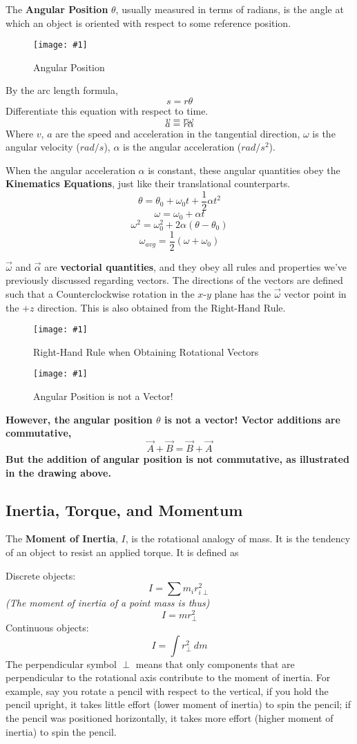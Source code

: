 \documentclass[11pt]{article}
\newcommand{\fig}[4]{
    \begin{figure}[H]
        \centering
        \texttt{[image: \#1]}
        \caption{#2}
        \label{exp4fit}
    \end{figure}
}
\theoremstyle{gangnamstyle}{\newtheorem{definition}{Definition}[]}
\theoremstyle{gangnamstyle}{\newtheorem{example}{Example}[]}
\theoremstyle{gangnamstyle}{\newtheorem{problem}{Problem}[]}
\begin{document}
The \textbf{Angular Position} $\theta$, usually measured in terms of radians, is the angle at which an object is oriented with respect to some reference position. 
\fig{figs/0718/radian.png}{Angular Position}{0.65}{0}
By the arc length formula, 
\[ s = r\theta \]
Differentiate this equation with respect to time. 
\[ v = r\omega \]
\[ a = r\alpha \]
Where $v$, $a$ are the speed and acceleration in the tangential direction, $\omega$ is the angular velocity ($rad/s$), $\alpha$ is the angular acceleration ($rad/s^2$). 

When the angular acceleration $\alpha$ is constant, these angular quantities obey the \textbf{Kinematics Equations}, just like their translational counterparts. 
\[ \theta = \theta_0 + \omega_0 t + \frac{1}{2} \alpha t^2 \]
\[ \omega = \omega_0 + \alpha t \]
\[ \omega^2 = \omega_0^2 + 2\alpha(\theta - \theta_0) \]
\[ \omega_{avg} = \frac{1}{2}(\omega + \omega_0) \]


$\Vec{\omega}$ and $\Vec{\alpha}$ are \textbf{vectorial quantities}, and they obey all rules and properties we've previously discussed regarding vectors. The directions of the vectors are defined such that a Counterclockwise rotation in the $x$-$y$ plane has the $\Vec{\omega}$ vector point in the $+z$ direction. This is also obtained from the Right-Hand Rule. 

\fig{figs/0718/rh-rule.png}{Right-Hand Rule when Obtaining Rotational Vectors}{0.5}{0}

\fig{figs/0718/rotations.png}{Angular Position is not a Vector!}{0.65}{0}

\textbf{However, the angular position $\theta$ is not a vector! Vector additions are commutative,}
\[ \Vec{A} + \Vec{B} = \Vec{B} + \Vec{A} \]
\textbf{But the addition of angular position is not commutative, as illustrated in the drawing above. }

\pagebreak

\subsection{Inertia, Torque, and Momentum}

The \textbf{Moment of Inertia}, $I$, is the rotational analogy of mass. It is the tendency of an object to resist an applied torque. It is defined as

Discrete objects:
\[ I = \sum m_i r_{i \perp}^2 \]
\textit{(The moment of inertia of a point mass is thus)}
\[ I = mr_\perp^2 \]
Continuous objects:
\[ I = \int r_{\perp}^2 \ dm \]
The perpendicular symbol $\perp$ means that only components that are perpendicular to the rotational axis contribute to the moment of inertia. For example, say you rotate a pencil with respect to the vertical, if you hold the pencil upright, it takes little effort (lower moment of inertia) to spin the pencil; if the pencil was positioned horizontally, it takes more effort (higher moment of inertia) to spin the pencil. 
\end{document}
